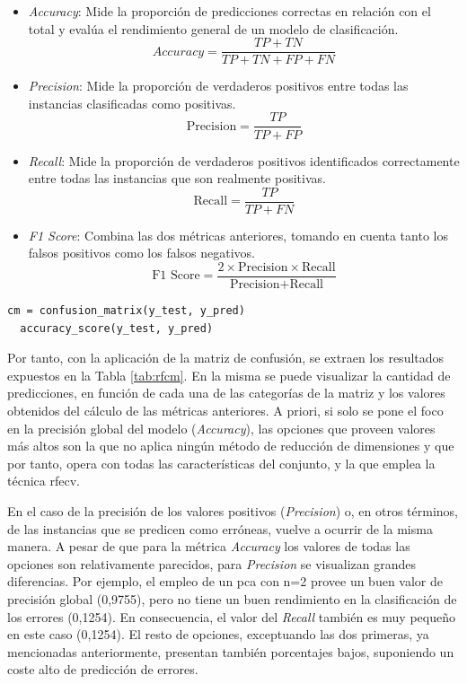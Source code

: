 \begin{itemize}
  \item \textit{Accuracy}: Mide la proporción de predicciones correctas en relación con el total y evalúa el rendimiento general de un modelo de clasificación.
  \[\textit{Accuracy} = \frac{{TP + TN}}{{TP + TN + FP + FN}}\]
  \item \textit{Precision}: Mide la proporción de verdaderos positivos entre todas las instancias clasificadas como positivas.
  \[\text{Precision} = \frac{{TP}}{{TP + FP}}\]
  \item \textit{Recall}: Mide la proporción de verdaderos positivos identificados correctamente entre todas las instancias que son realmente positivas. 
  \[\text{Recall} = \frac{{TP}}{{TP + FN}}\]
  \item \textit{F1 Score}: Combina las dos métricas anteriores, tomando en cuenta tanto los falsos positivos como los falsos negativos.
  \[\text{F1 Score} = \frac{{2 \times \text{Precision} \times \text{Recall}}}{{\text{Precision} + \text{Recall}}}\]
\end{itemize}

\begin{lstlisting}[style=Python, caption={Implementación de la matriz de confusión}]
  cm = confusion_matrix(y_test, y_pred)
  accuracy_score(y_test, y_pred)
\end{lstlisting}

\vspace{3mm}

Por tanto, con la aplicación de la matriz de confusión, se extraen los resultados expuestos en la Tabla \ref{tab:rfcm}. En la misma se puede visualizar la cantidad de predicciones, en función de cada una de las categorías de la matriz y los valores obtenidos del cálculo de las métricas anteriores. A priori, si solo se pone el foco en la precisión global del modelo (\textit{Accuracy}), las opciones que proveen valores más altos son la que no aplica ningún método de reducción de dimensiones y que por tanto, opera con todas las características del conjunto, y la que emplea la técnica \gls{rfecv}. 

\vspace{3mm}

En el caso de la precisión de los valores positivos (\textit{Precision}) o, en otros términos, de las instancias que se predicen como erróneas, vuelve a ocurrir de la misma manera. A pesar de que para la métrica \textit{Accuracy} los valores de todas las opciones son relativamente parecidos, para \textit{Precision} se visualizan grandes diferencias. Por ejemplo, el empleo de un \gls{pca} con n=2 provee un buen valor de precisión global (0,9755), pero no tiene un buen rendimiento en la clasificación de los errores (0,1254). En consecuencia, el valor del \textit{Recall} también es muy pequeño en este caso (0,1254). El resto de opciones, exceptuando las dos primeras, ya mencionadas anteriormente, presentan también porcentajes bajos, suponiendo un coste alto de predicción de errores. 

